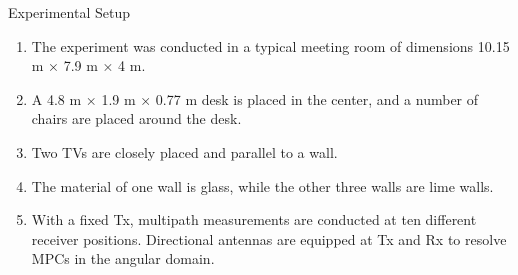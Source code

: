 \documentclass{beamer}
\begin{document}
\begin{frame}{Experimental Setup}
\begin{enumerate}
    \item The experiment was conducted in a typical meeting room of dimensions 10.15 m × 7.9 m × 4 m.
    \item A 4.8 m × 1.9 m × 0.77 m desk is placed in the center, and a number of chairs are placed around the desk.
    \item Two TVs are closely placed and parallel to a wall.
    \item The material of one wall is glass, while the other three walls are lime walls.
    \item With a fixed Tx, multipath measurements are conducted at ten different receiver positions. Directional antennas are equipped at Tx and Rx to resolve MPCs in the angular domain.
\end{enumerate}
\end{frame}
\end{document}

